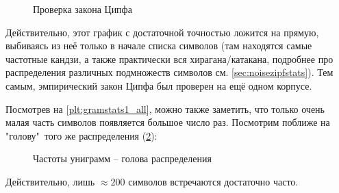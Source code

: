 \loadedtable

\begin{center}

\begin{figure}[H]
	\caption{Проверка закона Ципфа}
	\label{plt:gramstats1log}
\end{figure}
\end{center}

Действительно, этот график с достаточной точностью ложится на прямую, выбиваясь из неё только в начале списка символов (там находятся самые частотные кандзи, а также практически вся хирагана/катакана, подробнее про распределения различных подмножеств символов см. \cref{sec:noisezipfstats}). Тем самым, эмпирический закон Ципфа был проверен на ещё одном корпусе.

Посмотрев на \cref{plt:gramstats1_all}, можно также заметить, что только очень малая часть символов появляется большое число раз. Посмотрим поближе на "голову"\ того же распределения (\cref{plt:gramstats1_head}):

\begin{center}

\begin{figure}[H]
	\caption{Частоты униграмм -- голова распределения }
	\label{plt:gramstats1_head}
\end{figure}
\end{center}
Действительно, лишь $\approx 200$ символов встречаются достаточно часто.


